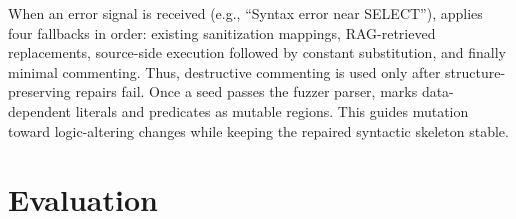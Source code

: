 \documentclass[conference]{IEEEtran}
\begin{document}
When an error signal is received (e.g., ``Syntax error near SELECT''), \tool{} applies four fallbacks in order: existing sanitization mappings, RAG-retrieved replacements, source-side execution followed by constant substitution, and finally minimal commenting.
Thus, destructive commenting is used only after structure-preserving repairs fail.
Once a seed passes the fuzzer parser, \tool{} marks data-dependent literals and predicates as mutable regions.
This guides mutation toward logic-altering changes while keeping the repaired syntactic skeleton stable.
\section{Evaluation}
\label{sec:evaluation}
\end{document}
